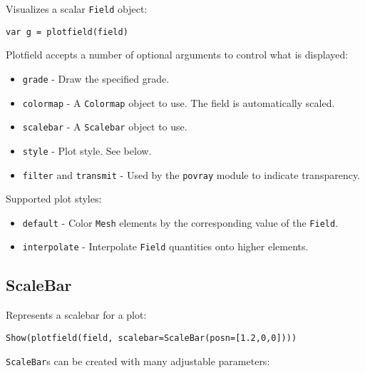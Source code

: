 Visualizes a scalar \texttt{Field} object:

\begin{lstlisting}
var g = plotfield(field)
\end{lstlisting}

Plotfield accepts a number of optional arguments to control what is
displayed:

\begin{itemize}

\item
  \texttt{grade} - Draw the specified grade.
\item
  \texttt{colormap} - A \texttt{Colormap} object to use. The field is
  automatically scaled.
\item
  \texttt{scalebar} - A \texttt{Scalebar} object to use.
\item
  \texttt{style} - Plot style. See below.
\item
  \texttt{filter} and \texttt{transmit} - Used by the \texttt{povray}
  module to indicate transparency.
\end{itemize}

Supported plot styles:

\begin{itemize}

\item
  \texttt{default} - Color \texttt{Mesh} elements by the corresponding
  value of the \texttt{Field}.
\item
  \texttt{interpolate} - Interpolate \texttt{Field} quantities onto
  higher elements.
\end{itemize}

\hypertarget{scalebar}{%
\subsection{ScaleBar}\label{scalebar}}

Represents a scalebar for a plot:

\begin{lstlisting}
Show(plotfield(field, scalebar=ScaleBar(posn=[1.2,0,0])))
\end{lstlisting}

\texttt{ScaleBar}s can be created with many adjustable parameters:

